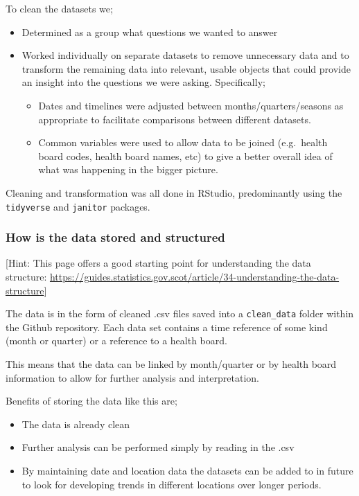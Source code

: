 \documentclass[
]{article}
\providecommand{\tightlist}{%
  \setlength{\itemsep}{0pt}\setlength{\parskip}{0pt}}
\begin{document}
To clean the datasets we;

\begin{itemize}
\item
  Determined as a group what questions we wanted to answer
\item
  Worked individually on separate datasets to remove unnecessary data
  and to transform the remaining data into relevant, usable objects that
  could provide an insight into the questions we were asking.
  Specifically;

  \begin{itemize}
  \tightlist
  \item
    Dates and timelines were adjusted between months/quarters/seasons as
    appropriate to facilitate comparisons between different datasets.
  \item
    Common variables were used to allow data to be joined (e.g.~health
    board codes, health board names, etc) to give a better overall idea
    of what was happening in the bigger picture.
  \end{itemize}
\end{itemize}

Cleaning and transformation was all done in RStudio, predominantly using
the \texttt{tidyverse} and \texttt{janitor} packages.

\hypertarget{how-is-the-data-stored-and-structured}{%
\subsubsection{How is the data stored and
structured}\label{how-is-the-data-stored-and-structured}}

{[}Hint: This page offers a good starting point for understanding the
data structure:
\url{https://guides.statistics.gov.scot/article/34-understanding-the-data-structure}{]}

The data is in the form of cleaned .csv files saved into a
\texttt{clean\_data} folder within the Github repository. Each data set
contains a time reference of some kind (month or quarter) or a reference
to a health board.

This means that the data can be linked by month/quarter or by health
board information to allow for further analysis and interpretation.

Benefits of storing the data like this are;

\begin{itemize}
\tightlist
\item
  The data is already clean
\item
  Further analysis can be performed simply by reading in the .csv
\item
  By maintaining date and location data the datasets can be added to in
  future to look for developing trends in different locations over
  longer periods.
\end{itemize}
\end{document}
